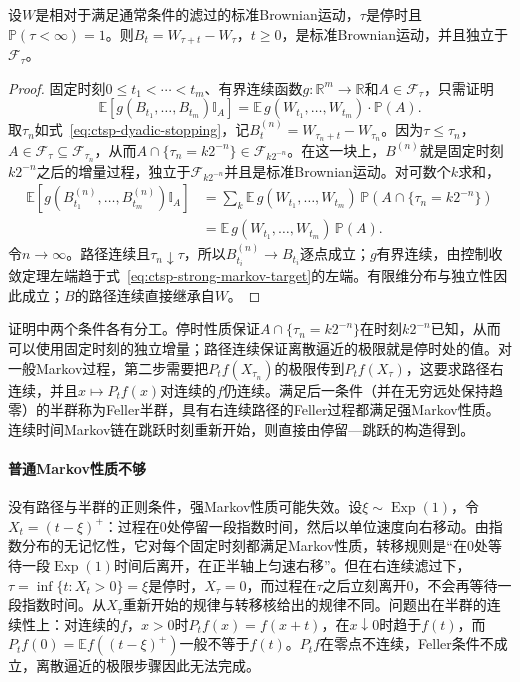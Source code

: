 \begin{theorem}[Brownian运动的强Markov性质]
  \label{thm:ctsp-brownian-strong-markov}
  设$W$是相对于满足通常条件的滤过的标准Brownian运动，$\tau$是停时且$\mathbb P(\tau<\infty)=1$。则$B_t=W_{\tau+t}-W_\tau$，$t\geq0$，是标准Brownian运动，并且独立于$\mathcal F_\tau$。
\end{theorem}

\begin{proof}
固定时刻$0\leq t_1<\cdots<t_m$、有界连续函数$g:\mathbb R^m\to\mathbb R$和$A\in\mathcal F_\tau$，只需证明
\begin{equation}
  \mathbb E[g(B_{t_1},\ldots,B_{t_m})\mathbb I_A]=\mathbb E\,g(W_{t_1},\ldots,W_{t_m})\cdot\mathbb P(A).
  \label{eq:ctsp-strong-markov-target}
\end{equation}
取$\tau_n$如式~\eqref{eq:ctsp-dyadic-stopping}，记$B^{(n)}_t=W_{\tau_n+t}-W_{\tau_n}$。因为$\tau\leq\tau_n$，$A\in\mathcal F_\tau\subseteq\mathcal F_{\tau_n}$，从而$A\cap\{\tau_n=k2^{-n}\}\in\mathcal F_{k2^{-n}}$。在这一块上，$B^{(n)}$就是固定时刻$k2^{-n}$之后的增量过程，独立于$\mathcal F_{k2^{-n}}$并且是标准Brownian运动。对可数个$k$求和，
\[
  \begin{aligned}
    \mathbb E[g(B^{(n)}_{t_1},\ldots,B^{(n)}_{t_m})\mathbb I_A]
    &=\sum_k\mathbb E\,g(W_{t_1},\ldots,W_{t_m})\,\mathbb P(A\cap\{\tau_n=k2^{-n}\})\\
    &=\mathbb E\,g(W_{t_1},\ldots,W_{t_m})\,\mathbb P(A).
  \end{aligned}
\]
令$n\to\infty$。路径连续且$\tau_n\downarrow\tau$，所以$B^{(n)}_{t_i}\to B_{t_i}$逐点成立；$g$有界连续，由控制收敛定理左端趋于式~\eqref{eq:ctsp-strong-markov-target}的左端。有限维分布与独立性因此成立；$B$的路径连续直接继承自$W$。
\end{proof}

证明中两个条件各有分工。停时性质保证$A\cap\{\tau_n=k2^{-n}\}$在时刻$k2^{-n}$已知，从而可以使用固定时刻的独立增量；路径连续保证离散逼近的极限就是停时处的值。对一般Markov过程，第二步需要把$P_tf(X_{\tau_n})$的极限传到$P_tf(X_\tau)$，这要求路径右连续，并且$x\mapsto P_tf(x)$对连续的$f$仍连续。满足后一条件（并在无穷远处保持趋零）的半群称为Feller半群，具有右连续路径的Feller过程都满足强Markov性质。连续时间Markov链在跳跃时刻重新开始，则直接由停留—跳跃的构造得到。

\paragraph{普通Markov性质不够}
没有路径与半群的正则条件，强Markov性质可能失效。设$\xi\sim\operatorname{Exp}(1)$，令$X_t=(t-\xi)^+$：过程在$0$处停留一段指数时间，然后以单位速度向右移动。由指数分布的无记忆性，它对每个固定时刻都满足Markov性质，转移规则是“在$0$处等待一段$\operatorname{Exp}(1)$时间后离开，在正半轴上匀速右移”。但在右连续滤过下，$\tau=\inf\{t:X_t>0\}=\xi$是停时，$X_\tau=0$，而过程在$\tau$之后立刻离开$0$，不会再等待一段指数时间。从$X_\tau$重新开始的规律与转移核给出的规律不同。问题出在半群的连续性上：对连续的$f$，$x>0$时$P_tf(x)=f(x+t)$，在$x\downarrow0$时趋于$f(t)$，而$P_tf(0)=\mathbb Ef((t-\xi)^+)$一般不等于$f(t)$。$P_tf$在零点不连续，Feller条件不成立，离散逼近的极限步骤因此无法完成。

